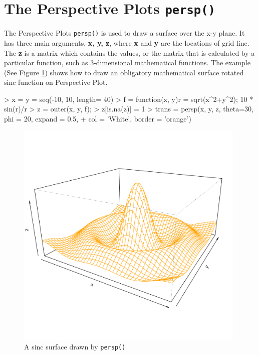 \documentclass[11pt,twoside]{report}
\begin{document}
\section{The Perspective Plots \texttt{persp()}}
The Perspective Plots \texttt{persp()} is used to draw a surface over the x-y plane.  
It has three main arguments, \textbf{x, y, z}, where \textbf{x} and \textbf{y} are the locations of grid line. The \textbf{z} is a matrix which contains the values, or the matrix that is calculated by a particular function, such as 3-dimensional mathematical functions. The example (See Figure \ref{figure_3.1}) shows how to draw an obligatory mathematical surface rotated sinc function on Perspective Plot.
\begin{Schunk}
\begin{Sinput}
> x = y = seq(-10, 10, length= 40)
> f = function(x, y){r = sqrt(x^2+y^2); 10 * sin(r)/r }
> z = outer(x, y, f);  
> z[is.na(z)] = 1
> trans = persp(x, y, z, theta=30, phi = 20, expand = 0.5,
+               col = 'White', border = 'orange')
\end{Sinput}
\end{Schunk}
\begin{figure}[h]
	\begin{center}
		\includegraphics[height = 11cm, width = 11cm]{figure/standalone_1.pdf}
		\caption{A sinc surface drawn by \texttt{persp()}}
		\label{figure_3.1}
	\end{center}
\end{figure}
\end{document}
